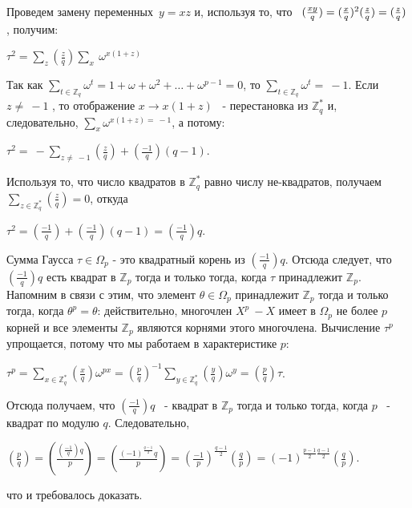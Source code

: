 \documentclass{mai_book}
\begin{document}

Проведем замену переменных~$y = xz$ и, используя то, что ~$(\frac{xy}{q}) = (\frac xq)^2(\frac zq) \\ = (\frac zq) $, получим:
\begin{center}
$\tau^2 = \underset{z}{\sum} (\frac zq) \underset{x}{\sum} \ \omega^{x(1+z)} $
\end{center}
Так как $\sum_{t \in \mathbb{Z}_q} \omega^t = 1 + \omega + \omega^2 + \dots + \omega^{p-1} = 0 $, то $\sum_{t \in \mathbb{Z}_q} \omega^t = ~-1$. Если $z \not=~-1$
, то отображение $x \rightarrow x(1+z) $
 ~- перестановка из $\mathbb{Z}_q^*$
 и, следовательно, $\sum_{x} \omega^{x(1+z) = ~-1}$, а потому:

\begin{center}
$\tau^2 = ~- \underset{z \not= ~-1}{\sum} (\frac zq) + (\frac{-1}{q})(q - 1) $.
\end{center}


Используя то, что число квадратов в $\mathbb{Z}_q^*$
 равно числу не-квадратов, получаем  $\sum_{z \in \mathbb{Z}_q^*} (\frac zq) = 0$, откуда

\begin{center}
$\tau^2 = (\frac{-1}{q}) + (\frac{-1}{q})(q - 1) = (\frac{-1}{q})q $.
\end{center}


\begin{thm}
Сумма Гаусса $\tau \in \Omega_p$ - это квадратный корень из $(\frac{-1}{q})q$. Отсюда следует, что $(\frac{-1}{q})q$
 есть квадрат в $\mathbb{Z}_p$
 тогда и только тогда, когда $\tau$
 принадлежит $\mathbb{Z}_p$. Напомним в связи с этим, что элемент $\theta \in \Omega_p$
 принадлежит $\mathbb{Z}_p$
 тогда и только тогда, когда $\theta^p = \theta$: действительно, многочлен $X^p ~- X$
 имеет в $\Omega_p$
 не более $p$ корней и все элементы $\mathbb{Z}_p$
 являются корнями этого многочлена. Вычисление $\tau^p$
 упрощается, потому что мы работаем в характеристике $p$:

\begin{center}
$\tau^p = \underset{x \in \mathbb{Z}_q^*}{\sum} (\frac xq)\omega^{px} = (\frac pq)^{-1} \underset{y \in \mathbb{Z}_q^*}{\sum} (\frac yq)\omega^y = (\frac pq)\tau$.
\end{center}


Отсюда получаем, что $(\frac{-1}{q})q$
 ~- квадрат в $\mathbb{Z}_p$
 тогда и только тогда, когда $p$ ~- квадрат по модулю $q$. Следовательно, 

\begin{center}
$(\frac pq) = (\frac{(\frac{-1}{q})q}{p}) = (\frac{(-1)^{\frac{q-1}{2}}q}{p}) = (\frac{-1}{p})^{\frac{q-1}{2}}(\frac qp) = (-1)^{\frac{p-1}{2}\frac{q-1}{2}} (\frac qp)$.
\end{center}


что и требовалось доказать.
\end{thm}
\end{document}
